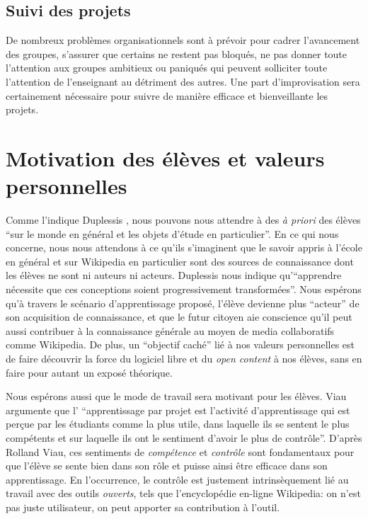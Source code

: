 \documentclass[11pt,bibliography=totoc]{scrartcl}
\begin{document}
\subsection{Suivi des projets}
De nombreux problèmes organisationnels sont à prévoir pour cadrer l'avancement
des groupes, s'assurer que certains ne restent pas bloqués, ne pas donner toute
l'attention aux groupes ambitieux ou paniqués qui peuvent solliciter toute
l'attention de l'enseignant au détriment des autres.  Une part d'improvisation
sera certainement nécessaire pour suivre de manière efficace et bienveillante
les projets.

\section{Motivation des élèves et valeurs personnelles}
Comme l'indique Duplessis \cite{duplessis}, nous pouvons nous attendre à des
\textit{à priori} des élèves ``sur le monde en général et les objets d'étude en
particulier''. En ce qui nous concerne, nous nous attendons à ce qu'ils
s'imaginent que le savoir appris à l'école en général et sur Wikipedia en
particulier sont des sources de connaissance dont les élèves ne sont ni auteurs ni
acteurs. Duplessis nous indique qu'``apprendre nécessite que ces conceptions
soient progressivement transformées''. Nous espérons qu'à travers le scénario
d'apprentissage proposé, l'élève devienne plus ``acteur'' de son acquisition de
connaissance, et que le futur citoyen aie conscience qu'il peut aussi contribuer
à la connaissance générale au moyen de media collaboratifs comme Wikipedia.
De plus, un ``objectif caché'' lié à nos valeurs personnelles est de faire
découvrir la force du logiciel libre et du \textit{open content} à nos élèves,
sans en faire pour autant un exposé théorique.
 
Nous espérons aussi que le mode de travail sera motivant pour les élèves. Viau
\cite{viau} argumente que l' ``apprentissage par projet est l'activité
d'apprentissage qui est perçue par les étudiants comme la plus utile, dans
laquelle ils se sentent le plus compétents et sur laquelle ils ont le sentiment
d'avoir le plus de contrôle''. D'après Rolland Viau, ces sentiments de
\textit{compétence} et \textit{contrôle} sont fondamentaux pour que l'élève se
sente bien dans son rôle et puisse ainsi être efficace dans son apprentissage.
En l'occurrence, le contrôle est justement intrinsèquement lié au travail avec
des outils \textit{ouverts}, tels que l'encyclopédie en-ligne Wikipedia: on
n'est pas juste utilisateur, on peut apporter sa contribution à l'outil.
\end{document}

